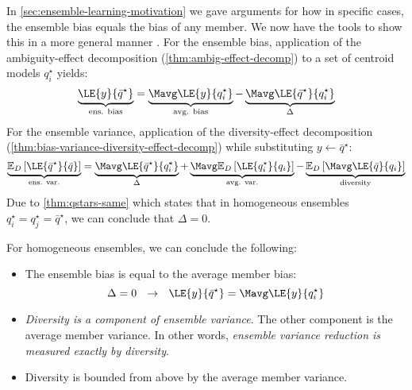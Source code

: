 \documentclass[../main.tex]{subfiles}
\begin{document}
In \cref{sec:ensemble-learning-motivation} we gave arguments for how in specific cases, the ensemble bias equals the bias of any member. We now have the tools to show this in a more general manner \cite{wood_UnifiedTheoryDiversity_2023}.
For the ensemble bias, application of the ambiguity-effect decomposition (\cf \ref{thm:ambig-effect-decomp}) to a set of centroid models $q_{i}^\star$ yields:
$$
\underbrace{
\LE{y}{\bar{q}^\star} 
}_{\text{ens. bias}}
= 
\underbrace{
\Mavg \LE{y}{q_{i}^\star}
}_{\text{avg. bias}}
- 
\underbrace{
\Mavg\LE{\bar{q}^\star}{q_{i}^\star}
}_{\Delta}
$$
For the ensemble variance, application of the diversity-effect decomposition (\ref{thm:bias-variance-diversity-effect-decomp}) while substituting $y \gets \bar{q}^\star$:
$$
\underbrace{
\mathbb{E}_{D}\left[ \LE{\bar{q}^\star}{\bar{q}} \right]
}_{\text{ens. var.}}
 = 
\underbrace{
\Mavg \LE{\bar{q}^\star}{q_{i}^\star} 
}_{\Delta}
+ 
\underbrace{
\Mavg \mathbb{E}_{D}\left[ \LE{q_{i}^\star}{q_{i}} \right] 
}_{\text{avg. var.}}
- 
\underbrace{
\mathbb{E}_{D}\left[ \Mavg \LE{\bar{q}}{q_{i}} \right] 
}_{\text{diversity}}
$$
Due to \cref{thm:qstars-same} which states that in homogeneous ensembles $q_{i}^\star = q_{j}^\star = \bar{q}^\star$, we can conclude that $\Delta = 0$. 
\begin{corollary} For homogeneous ensembles, we can conclude the following:
\begin{itemize}
    \item The ensemble bias is equal to the average member bias:
$$
\Delta = 0 ~ ~ \rightarrow ~ ~ \LE{y}{\bar{q}^\star} = \Mavg \LE{y}{q_{i}^\star}
$$
\item \textit{Diversity is a component of ensemble variance}. The other component is the average member variance. In other words, \textit{ensemble variance reduction is measured exactly by diversity}. 
\item Diversity is bounded from above by the average member variance.
\end{itemize}
\end{corollary}




\end{document}
